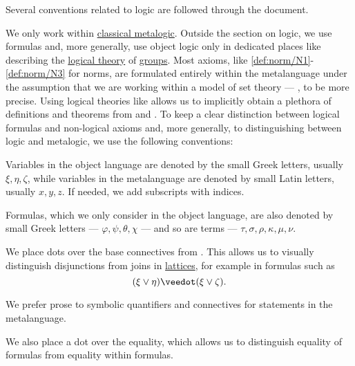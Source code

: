 \begin{remark}\label{rem:mathematical_logic_conventions}
  Several conventions related to logic are followed through the document.

  We only work within \hyperref[def:classical_propositional_deductive_systems]{classical metalogic}. Outside the section on logic, we use formulas and, more generally, use object logic only in dedicated places like  describing the \hyperref[def:first_order_theory]{logical theory} of \hyperref[def:group]{groups}. Most axioms, like \ref{def:norm/N1}-\ref{def:norm/N3} for norms, are formulated entirely within the metalanguage under the assumption that we are working within a model of set theory --- \hyperref[def:axiom_of_universes]{}, to be more precise. Using logical theories like  allows us to implicitly obtain a plethora of definitions and theorems from  and . To keep a clear distinction between logical formulas and non-logical axioms and, more generally, to distinguishing between logic and metalogic, we use the following conventions:

  \begin{thmenum}
     Variables in the object language are denoted by the small Greek letters, usually \( \xi, \eta, \zeta \), while variables in the metalanguage are denoted by small Latin letters, usually \( x, y, z \). If needed, we add subscripts with indices.

     Formulas, which we only consider in the object language, are also denoted by small Greek letters --- \( \varphi, \psi, \theta, \chi \) --- and so are terms --- \( \tau, \sigma, \rho, \kappa, \mu, \nu \).

     We place dots over the base connectives from . This allows us to visually distinguish disjunctions from joins in \hyperref[def:lattice]{lattices}, for example in formulas such as
    \begin{equation*}
      (\xi \vee \eta) \synvee (\xi \vee \zeta).
    \end{equation*}

    We prefer prose to symbolic quantifiers and connectives for statements in the metalanguage.

    We also place a dot over the equality, which allows us to distinguish equality of formulas from equality within formulas.


\end{thmenum}
\end{remark}
